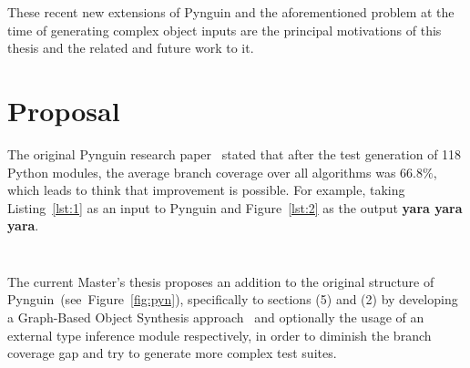 \documentclass[%
  chapterprefix=false,%
  open=right,%
  twoside=true,%
  paper=a4,%
  logofile={Figures/logo.png},%
  thesistype=master,%
  UKenglish,%
]{se2thesis}
\begin{document}
These recent new extensions of Pynguin and the aforementioned problem at the time of generating complex object inputs are the principal motivations of this thesis and the related and future work to it.

\chapter{Proposal}

The original Pynguin research paper~\cite{DBLP:conf/icse/LukasczykF22} stated that after the test generation of 118 Python modules, the average branch coverage over all algorithms was $66.8\%$, which leads to think that improvement is possible.
For example, taking Listing~\ref{lst:1} as an input to Pynguin and Figure~\ref{lst:2} as the output \textbf{yara yara yara}.

\begin{figure}
  \centering
  \begin{minipage}{.5\textwidth}
    \centering
    \inputminted{python}{Figures/listing1.py}
  \end{minipage}%
  \begin{minipage}{.5\textwidth}
    \centering
    \inputminted{python}{Figures/listing1.py}
  \end{minipage}%
\end{figure}
The current Master's thesis proposes an addition to the original structure of Pynguin~(see~Figure~\ref{fig:pyn}), specifically to sections (5) and (2) by developing
a Graph-Based Object Synthesis approach~\cite{DBLP:conf/sigsoft/0001O00D21} and optionally the usage of an external type inference module respectively, in order to diminish the branch coverage gap and try to generate more complex test suites.
\end{document}
